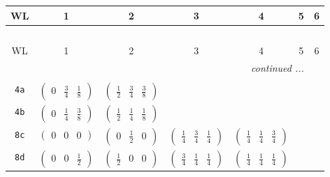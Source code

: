 \documentclass[fleqn,9pt,landscape]{jsarticle}
\begin{document}
\begin{center}
\renewcommand{\arraystretch}{1.2}
\begin{longtable}{ccccccc}
 \hline \hline
WL & 1 & 2 & 3 & 4 & 5 & 6 \\ \hline \endfirsthead

\multicolumn{6}{l}{\tablename\ \thetable{}} \\
 \hline \hline
WL & 1 & 2 & 3 & 4 & 5 & 6 \\ \hline \endhead

 \hline \hline
\multicolumn{6}{r}{\footnotesize\it continued ...} \\ \endfoot

 \hline \hline
\multicolumn{6}{r}{} \\ \endlastfoot

{\tt 4a} & $ \begin{pmatrix} 0 & \frac{3}{4} & \frac{1}{8} \end{pmatrix} $ & $ \begin{pmatrix} \frac{1}{2} & \frac{3}{4} & \frac{3}{8} \end{pmatrix} $ & $  $ & $  $ & $  $ & $  $ \\ \hline
{\tt 4b} & $ \begin{pmatrix} 0 & \frac{1}{4} & \frac{3}{8} \end{pmatrix} $ & $ \begin{pmatrix} \frac{1}{2} & \frac{1}{4} & \frac{1}{8} \end{pmatrix} $ & $  $ & $  $ & $  $ & $  $ \\ \hline
{\tt 8c} & $ \begin{pmatrix} 0 & 0 & 0 \end{pmatrix} $ & $ \begin{pmatrix} 0 & \frac{1}{2} & 0 \end{pmatrix} $ & $ \begin{pmatrix} \frac{1}{4} & \frac{3}{4} & \frac{1}{4} \end{pmatrix} $ & $ \begin{pmatrix} \frac{1}{4} & \frac{1}{4} & \frac{3}{4} \end{pmatrix} $ & $  $ & $  $ \\ \hline
{\tt 8d} & $ \begin{pmatrix} 0 & 0 & \frac{1}{2} \end{pmatrix} $ & $ \begin{pmatrix} \frac{1}{2} & 0 & 0 \end{pmatrix} $ & $ \begin{pmatrix} \frac{3}{4} & \frac{1}{4} & \frac{1}{4} \end{pmatrix} $ & $ \begin{pmatrix} \frac{1}{4} & \frac{1}{4} & \frac{1}{4} \end{pmatrix} $ & $  $ & $  $ \\ \hline

\end{longtable}
\end{center}
\end{document}
